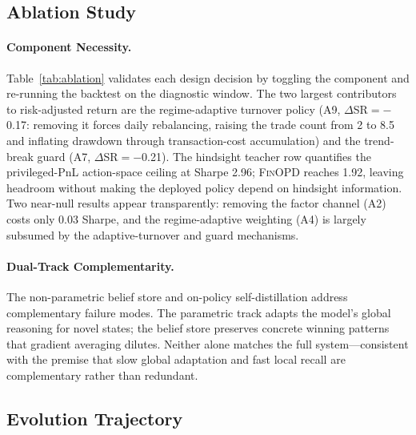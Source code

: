 \subsection{Ablation Study}



\paragraph{Component Necessity.} Table~\ref{tab:ablation} validates each design decision by toggling the component and re-running the backtest on the diagnostic window. The two largest contributors to risk-adjusted return are the regime-adaptive turnover policy (A9, $\Delta$SR$=-$0.17: removing it forces daily rebalancing, raising the trade count from 2 to 8.5 and inflating drawdown through transaction-cost accumulation) and the trend-break guard (A7, $\Delta$SR$=-$0.21). The hindsight teacher row quantifies the privileged-PnL action-space ceiling at Sharpe 2.96; \textsc{FinOPD} reaches 1.92, leaving headroom without making the deployed policy depend on hindsight information. Two near-null results appear transparently: removing the factor channel (A2) costs only 0.03 Sharpe, and the regime-adaptive weighting (A4) is largely subsumed by the adaptive-turnover and guard mechanisms.

\paragraph{Dual-Track Complementarity.} The non-parametric belief store and on-policy self-distillation address complementary failure modes. The parametric track adapts the model's global reasoning for novel states; the belief store preserves concrete winning patterns that gradient averaging dilutes. Neither alone matches the full system---consistent with the premise that slow global adaptation and fast local recall are complementary rather than redundant.

\subsection{Evolution Trajectory}



